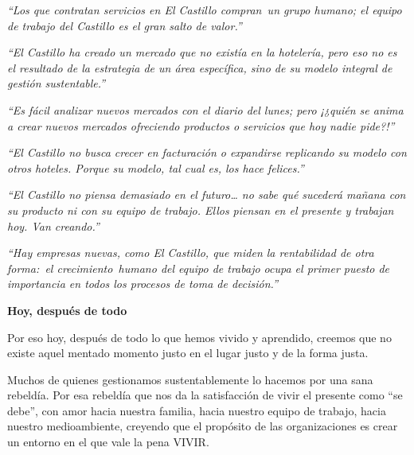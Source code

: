 \emph{``Los que contratan servicios en El Castillo compran~un grupo
humano; el equipo de trabajo del Castillo es el gran salto de valor.''}

\emph{``El Castillo ha creado un mercado que no existía en la hotelería,
pero eso no es el resultado de la estrategia de un área específica, sino
de su modelo integral de gestión sustentable.''}

\emph{``Es fácil analizar nuevos mercados con el diario del lunes; pero
¡¿quién se anima a crear nuevos mercados ofreciendo productos o
servicios que hoy nadie pide?!''}

\emph{``El Castillo no busca crecer en facturación o expandirse
replicando su modelo con otros hoteles. Porque su modelo, tal cual es,
los hace felices.''}

\emph{``El Castillo no piensa demasiado en el futuro\ldots{} no sabe qué
sucederá mañana con su producto ni con su equipo de trabajo. Ellos
piensan en el presente y trabajan hoy. Van creando.''}

\emph{``Hay empresas nuevas, como El Castillo, que miden la rentabilidad
de otra forma:~el crecimiento~humano del equipo de trabajo ocupa el
primer puesto de importancia en todos los procesos de toma de
decisión.''}

\textbf{Hoy, después de todo}

Por eso hoy, después de todo lo que hemos vivido y aprendido, creemos
que no existe aquel mentado momento justo en el lugar justo y de la
forma justa.

Muchos de quienes gestionamos sustentablemente lo hacemos por una sana
rebeldía. Por esa rebeldía que nos da la satisfacción de vivir el
presente como ``se debe'', con amor hacia nuestra familia, hacia nuestro
equipo de trabajo, hacia nuestro medioambiente, creyendo que el
propósito de las organizaciones es crear un entorno en el que vale la
pena VIVIR.